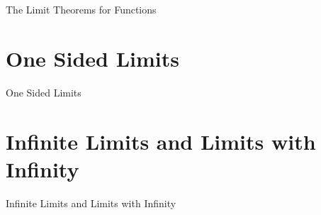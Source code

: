 The Limit Theorems for Functions

\section{One Sided Limits}
\label{sec:one-sided-limits}

One Sided Limits

\section{Infinite Limits and Limits with Infinity}
\label{sec:infinite-limits-and-limits-with-infinity}

Infinite Limits and Limits with Infinity
